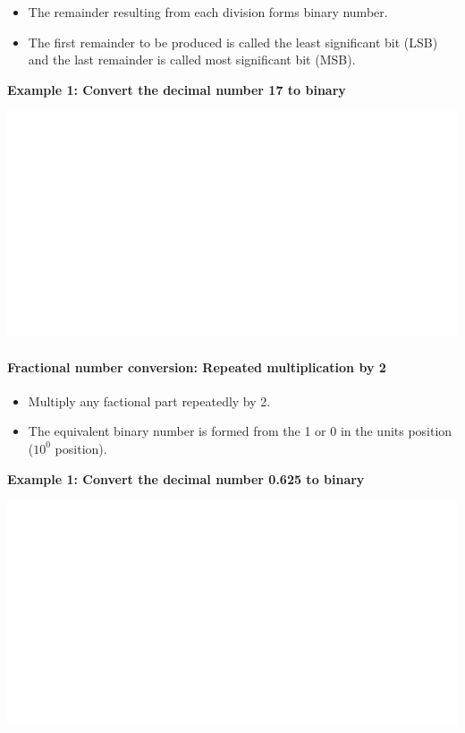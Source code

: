\documentclass[]{book}
\providecommand{\tightlist}{%
  \setlength{\itemsep}{0pt}\setlength{\parskip}{0pt}}
\let\oldparagraph\paragraph
\renewcommand{\paragraph}[1]{\oldparagraph{#1}\mbox{}}
\begin{document}
\begin{itemize}
\tightlist
\item
  The remainder resulting from each division forms binary number.
\item
  The first remainder to be produced is called the least significant bit (LSB) and the last remainder is called most significant bit (MSB).
\end{itemize}

\textbf{Example 1: Convert the decimal number 17 to binary}

\begin{center}\includegraphics[width=1\linewidth]{figure/NSbox5-1} \end{center}

\hypertarget{fractional-number-conversion-repeated-multiplication-by-2}{%
\paragraph{Fractional number conversion: Repeated multiplication by 2}\label{fractional-number-conversion-repeated-multiplication-by-2}}

\begin{itemize}
\tightlist
\item
  Multiply any factional part repeatedly by 2.
\item
  The equivalent binary number is formed from the 1 or 0 in the units position (\(10^0\) position).
\end{itemize}

\textbf{Example 1: Convert the decimal number 0.625 to binary}

\begin{center}\includegraphics[width=1\linewidth]{figure/NSbox6-1} \end{center}
\end{document}
